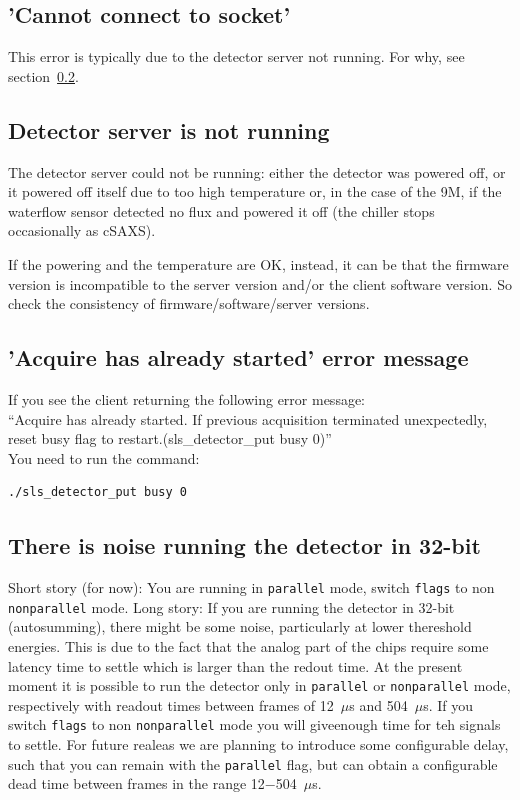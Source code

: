 \documentclass{article}
\begin{document}
\subsection{'Cannot connect to socket'}
This error is typically due to the detector server not running. For why, see section~\ref{servernot}.

\subsection{Detector server is not running}\label{servernot}
The detector server could not be running: either the detector was powered off, or it powered off itself due to too high temperature or, in the case of the 9M, if the waterflow sensor detected no flux and powered it off (the chiller stops occasionally as cSAXS).

If the powering and the temperature are OK, instead, it can be that the firmware version is incompatible to the server version and/or the client software version. So check the consistency of firmware/software/server versions.

\subsection{'Acquire has already started' error message}
If you see the client returning the following error message:\\ 
``Acquire has already started. If previous acquisition terminated unexpectedly, reset busy flag to restart.(sls\_detector\_put busy 0)''\\
 You need to run the command:
\begin{verbatim}
./sls_detector_put busy 0
\end{verbatim}

\subsection{There is noise running the detector in 32-bit}
Short story (for now): You are running in {\tt{parallel}} mode, switch {\tt{flags}} to non {\tt{nonparallel}} mode.
Long story: If you are running the detector in 32-bit (autosumming), there might be some noise, particularly at lower thereshold energies. This is due to the fact that the analog part of the chips require some latency time to settle which is larger than the redout time. At the present moment it is possible to run the detector only in {\tt{parallel}} or {\tt{nonparallel}} mode, respectively with readout times between frames of 12~$\mu$s and 504~$\mu$s. If you switch {\tt{flags}} to non {\tt{nonparallel}} mode you will giveenough time for teh signals to settle.  For future realeas we are planning to introduce some configurable delay, such that you can remain with the {\tt{parallel}} flag, but can obtain a configurable dead time between frames in the range 12$-$504~$\mu$s. 
 
\end{document}
